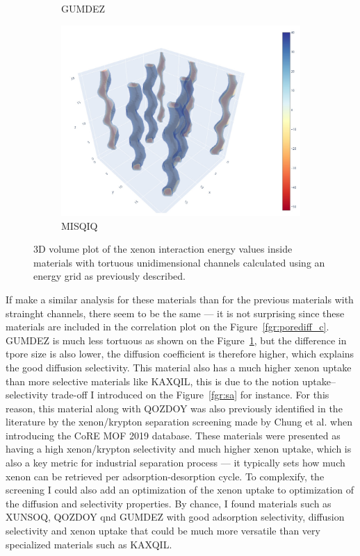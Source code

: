 \documentclass[main]{subfiles}
\begin{document}
\begin{figure}[ht]
\begin{subfigure}[b]{0.3\textwidth}
      \caption{GUMDEZ~\cite{Yin_2014}}\label{fgr:zigzag_b}
  \end{subfigure}
  \hfill
  \begin{subfigure}[b]{0.3\textwidth}
      \centering
      \includegraphics[width=\textwidth]{figures/5-diffusion/viz/MISQIQ.jpg}
      \caption{MISQIQ~\cite{Tong_2013}}\label{fgr:zigzag_c}
  \end{subfigure}
     \caption{ 3D volume plot of the xenon interaction energy values inside materials with tortuous unidimensional channels calculated using an energy grid as previously described.}\label{fgr:zigzag}
\end{figure}

If make a similar analysis for these materials than for the previous materials with strainght channels, there seem to be the same --- it is not surprising since these materials are included in the correlation plot on the Figure~\ref{fgr:porediff_c}. GUMDEZ is much less tortuous as shown on the Figure~\ref{fgr:zigzag_b}, but the difference in tpore size is also lower, the diffusion coefficient is therefore higher, which explains the good diffusion selectivity. This material also has a much higher xenon uptake than more selective materials like KAXQIL, this is due to the notion uptake--selectivity trade-off I introduced on the Figure~\ref{fgr:sa} for instance. For this reason, this material along with QOZDOY was also previously identified in the literature by the xenon/krypton separation screening made by Chung et al.\autocite{Chung_2019} when introducing the CoRE MOF 2019 database. These materials were presented as having a high xenon/krypton selectivity and much higher xenon uptake, which is also a key metric for industrial separation process --- it typically sets how much xenon can be retrieved per adsorption-desorption cycle. To complexify, the screening I could also add an optimization of the xenon uptake to optimization of the diffusion and selectivity properties. By chance, I found materials such as XUNSOQ, QOZDOY qnd GUMDEZ with good adsorption selectivity, diffusion selectivity and xenon uptake that could be much more versatile than very specialized materials such as KAXQIL. 
\end{document}
